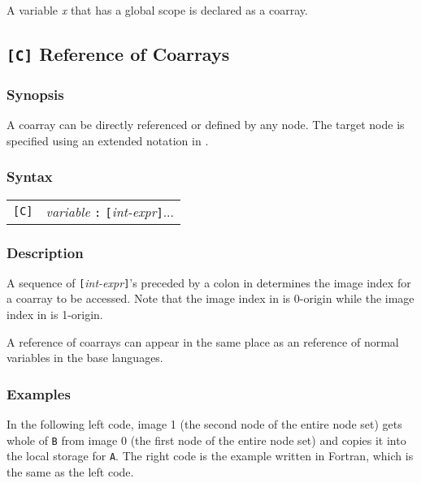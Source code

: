 A variable {\it x} that has a global scope is declared as a coarray.

\subsection{{\tt [C]} Reference of Coarrays}

\subsubsection*{Synopsis}
A coarray can be directly referenced or defined by any node. 
The target node is specified using an extended notation in {\XMPC}.

\subsubsection*{Syntax}

\begin{tabular}{ll}
\verb![C]! & {\it variable} {\tt :} {\tt [}{\it int-expr}{\tt ]}...\\
\end{tabular}

\subsubsection*{Description}

A sequence of {\tt [}{\it int-expr}{\tt ]}'s preceded by a colon in
{\XMPC} determines the image index for a coarray to be accessed.
Note that the image index in {\XMPC} is 0-origin while the image index in {\XMPF} is 1-origin.

A reference of coarrays can appear in the same place as an reference of
normal variables in the base languages.

\subsubsection*{Examples}

In the following left code, 
image 1 (the second node of the entire node set) gets whole of {\tt B} from image 0 (the first node of the entire node set) and
copies it into the local storage for {\tt A}.
The right code is the example written in Fortran, which is the same as the left code.
\vspace{0.3cm}

